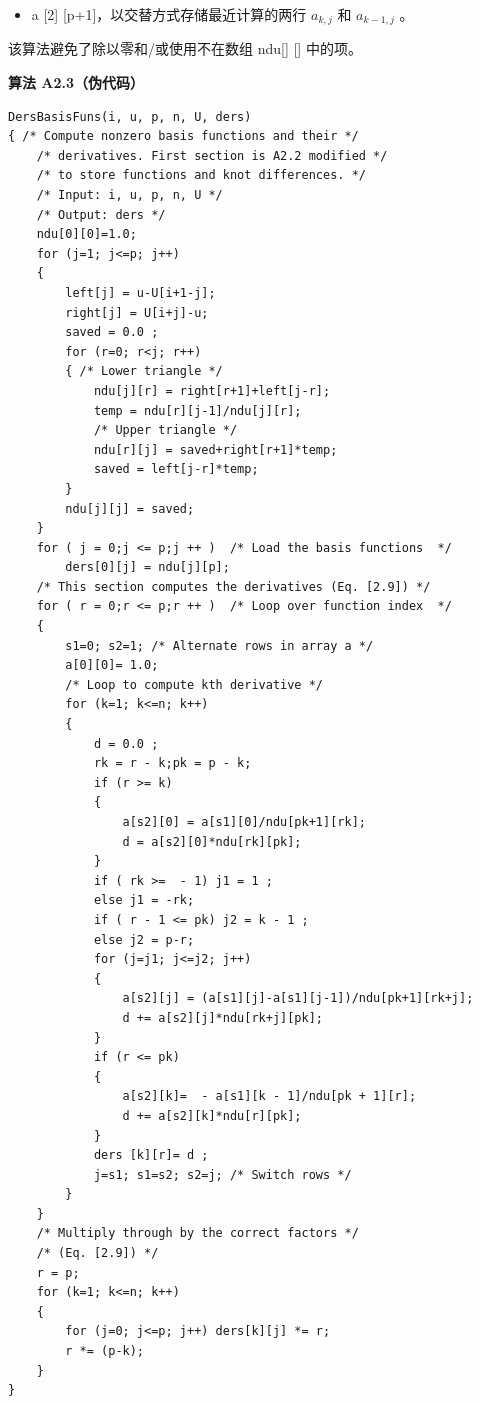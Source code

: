 \documentclass[../main.tex]{subfiles}
\begin{document}
\begin{itemize}
\item a [2] [p+1]，以交替方式存储最近计算的两行 \({a}_{k,j}\) 和 \({a}_{k - 1,j}\) 。
\end{itemize}

该算法避免了除以零和/或使用不在数组 ndu[] [] 中的项。

\par\medskip\noindent\textbf{算法 A2.3（伪代码）}\par
\begin{verbatim}
DersBasisFuns(i, u, p, n, U, ders)
{ /* Compute nonzero basis functions and their */
    /* derivatives. First section is A2.2 modified */
    /* to store functions and knot differences. */
    /* Input: i, u, p, n, U */
    /* Output: ders */
    ndu[0][0]=1.0;
    for (j=1; j<=p; j++)
    {
        left[j] = u-U[i+1-j];
        right[j] = U[i+j]-u;
        saved = 0.0 ;
        for (r=0; r<j; r++)
        { /* Lower triangle */
            ndu[j][r] = right[r+1]+left[j-r];
            temp = ndu[r][j-1]/ndu[j][r];
            /* Upper triangle */
            ndu[r][j] = saved+right[r+1]*temp;
            saved = left[j-r]*temp;
        }
        ndu[j][j] = saved;
    }
    for ( j = 0;j <= p;j ++ )  /* Load the basis functions  */
        ders[0][j] = ndu[j][p];
    /* This section computes the derivatives (Eq. [2.9]) */
    for ( r = 0;r <= p;r ++ )  /* Loop over function index  */
    {
        s1=0; s2=1; /* Alternate rows in array a */
        a[0][0]= 1.0;
        /* Loop to compute kth derivative */
        for (k=1; k<=n; k++)
        {
            d = 0.0 ;
            rk = r - k;pk = p - k;
            if (r >= k)
            {
                a[s2][0] = a[s1][0]/ndu[pk+1][rk];
                d = a[s2][0]*ndu[rk][pk];
            }
            if ( rk >=  - 1) j1 = 1 ;
            else j1 = -rk;
            if ( r - 1 <= pk) j2 = k - 1 ;
            else j2 = p-r;
            for (j=j1; j<=j2; j++)
            {
                a[s2][j] = (a[s1][j]-a[s1][j-1])/ndu[pk+1][rk+j];
                d += a[s2][j]*ndu[rk+j][pk];
            }
            if (r <= pk)
            {
                a[s2][k]=  - a[s1][k - 1]/ndu[pk + 1][r];
                d += a[s2][k]*ndu[r][pk];
            }
            ders [k][r]= d ;
            j=s1; s1=s2; s2=j; /* Switch rows */
        }
    }
    /* Multiply through by the correct factors */
    /* (Eq. [2.9]) */
    r = p;
    for (k=1; k<=n; k++)
    {
        for (j=0; j<=p; j++) ders[k][j] *= r;
        r *= (p-k);
    }
}
\end{verbatim}
\end{document}
